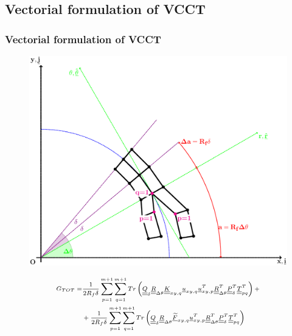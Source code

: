 \documentclass[first,firstsupp,lastsupp,last,hyperref,table]{ETHclass}
\begin{document}
\subsection{Vectorial formulation of VCCT}

\begin{frame}
\frametitle{\vspace{0.25cm}\small Vectorial formulation of VCCT}
\vspace{-.75cm}
\centering
\begin{figure}
\centering
\includegraphics[height=0.5\textheight]{VCCT-linear.pdf}
\end{figure}
\begin{equation*}
\scriptsize
\begin{split}
G_{TOT} =&\frac{1}{2R_{f}\delta}\sum_{p=1}^{m+1}\sum_{q=1}^{m+1}Tr\left(\underline{\underline{Q}}_{\delta}\underline{\underline{R}}_{\Delta\theta}\underline{\underline{K}}_{xy,q}\underline{u}_{xy,q}\underline{u}_{xy,p}^{T}\underline{\underline{R}}_{\Delta\theta}^{T}\underline{\underline{P}}_{\delta}^{T}\underline{\underline{T}}_{pq}^{T}\right)+\\&+\frac{1}{2R_{f}\delta}\sum_{p=1}^{m+1}\sum_{q=1}^{m+1}Tr\left(\underline{\underline{Q}}_{\delta}\underline{\underline{R}}_{\Delta\theta}\underline{\widetilde{F}}_{xy,q}\underline{u}_{xy,p}^{T}\underline{\underline{R}}_{\Delta\theta}^{T}\underline{\underline{P}}_{\delta}^{T}\underline{\underline{T}}_{pq}^{T}\right)
\end{split}
\end{equation*}
\end{frame}
\end{document}
